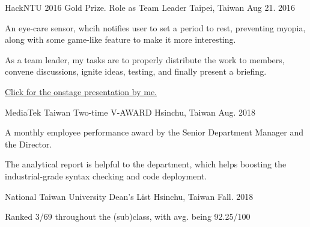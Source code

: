 

\begin{cventries}
\cventry
    {HackNTU 2016} %
    {Gold Prize. Role as Team Leader} %
    {Taipei, Taiwan} %
    {Aug 21. 2016} %
    {
      \begin{cvitems} %
        \item {An eye-care sensor, whcih notifies user to set a period to rest, preventing myopia, along with some game-like feature to make it more interesting.}
        \item {As a team leader, my tasks are to properly distribute the work to members, convene discussions, ignite ideas, testing, and finally present a briefing.}
        \item {\href{https://www.youtube.com/watch?v=LerD1-Vispg}{Click for the onstage presentation by me.}}
      \end{cvitems}
    } 

\cventry
    {MediaTek Taiwan} %
    {Two-time V-AWARD} %
    {Hsinchu, Taiwan} %
    {Aug. 2018} %
    {
      \begin{cvitems} %
        \item {A monthly employee performance award by the Senior Department Manager and the Director.}
        \item {The analytical report is helpful to the department, which helps boosting the industrial-grade syntax checking and code deployment.}
      \end{cvitems}
    }

\cventry
    {National Taiwan University} %
    {Dean's List} %
    {Hsinchu, Taiwan} %
    {Fall. 2018} %
    {
      \begin{cvitems} %
        \item {Ranked 3/69 throughout the (sub)class, with avg. being 92.25/100}
      \end{cvitems}
    }


\end{cventries}
